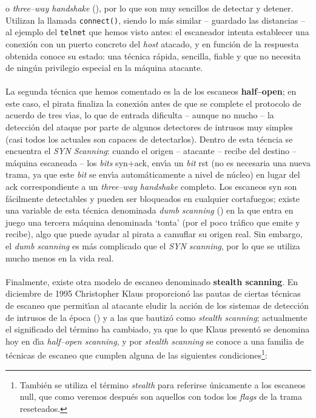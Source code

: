 o {\it three--way handshake} (\cite{kn:tom75}), por lo que son muy sencillos de 
detectar y detener. Utilizan la llamada {\tt connect()}, siendo lo m\'as similar
-- guardado las distancias -- al ejemplo del {\tt telnet} que hemos visto antes:
el escaneador intenta establecer una conexi\'on con un puerto concreto del {\it 
host} atacado, y en funci\'on de la respuesta obtenida conoce su estado: una
t\'ecnica r\'apida, sencilla, fiable y que no necesita de ning\'un privilegio 
especial en la m\'aquina atacante.\\
\\La segunda t\'ecnica que hemos comentado es la de los escaneos {\bf 
half--open}; en este caso, el pirata finaliza la conexi\'on antes de que se 
complete el protocolo de acuerdo de tres v\'{\i}as, lo que de entrada dificulta 
-- aunque no mucho --
la detecci\'on del ataque por parte de algunos detectores de intrusos muy 
simples (casi todos los actuales son capaces de detectarlos). Dentro de esta
t\'ecncia se encuentra el {\it SYN Scanning}: cuando el origen -- atacante --
recibe del destino -- m\'aquina escaneada -- los {\it bits} {\sc syn+ack}, 
env\'{\i}a un {\it bit} {\sc rst} (no es necesaria una nueva trama, ya que este
{\it bit} se env\'{\i}a autom\'aticamente a nivel de n\'ucleo) en lugar del
{\sc ack} correspondiente a un {\it three--way handshake} completo. Los escaneos
{\sc syn} son f\'acilmente detectables y pueden ser bloqueados en cualquier 
cortafuegos; existe una variable de esta t\'ecnica denominada {\it dumb 
scanning} (\cite{kn:det01}) en la que entra en juego una tercera m\'aquina 
denominada `tonta' (por el poco tr\'afico que emite y recibe), algo que puede 
ayudar al pirata a camuflar su origen real. Sin embargo, el {\it dumb scanning} 
es m\'as complicado que el {\it SYN scanning}, por lo que se utiliza mucho 
menos en la vida real.\\
\\Finalmente, existe otra modelo de escaneo denominado {\bf stealth 
scanning}. En diciembre de 1995 Christopher Klaus proporcion\'o las pautas de 
ciertas t\'ecnicas de escaneo que
permit\'{\i}an al atacante eludir la acci\'on de los sistemas de detecci\'on
de intrusos de la \'epoca (\cite{kn:kla95}) y a las que bautiz\'o como {\it 
stealth scanning}; actualmente el significado del t\'ermino ha cambiado, ya que
lo que Klaus present\'o se denomina hoy en d\'{\i}a {\it half--open scanning}, y
por {\it stealth scanning} se conoce a una familia de t\'ecnicas de escaneo que 
cumplen alguna de las siguientes condiciones\footnote{Tambi\'en se utiliza el
t\'ermino {\it stealth} para referirse \'unicamente a los escaneos {\sc null}, 
que como veremos despu\'es son aquellos con todos los {\it flags} de la trama 
reseteados.}:
